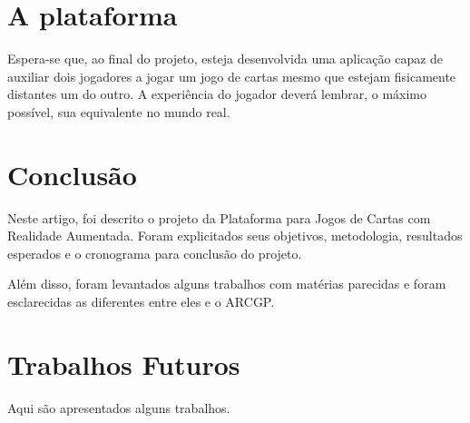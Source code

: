 \documentclass[conference]{IEEEtran}
\begin{document}
\section{A plataforma}
\label{plataforma}
Espera-se que, ao final do projeto, esteja desenvolvida uma aplicação capaz de 
auxiliar dois jogadores a jogar um jogo de cartas mesmo que estejam fisicamente 
distantes um do outro. A experiência do jogador deverá lembrar, o máximo 
possível, sua equivalente no mundo real.

\section{Conclusão}
\label{conclusao}
Neste artigo, foi descrito o projeto da Plataforma para Jogos de Cartas com 
Realidade Aumentada. Foram explicitados seus objetivos, metodologia, resultados 
esperados e o cronograma para conclusão do projeto.

Além disso, foram levantados alguns trabalhos com matérias parecidas e foram 
esclarecidas as diferentes entre eles e o ARCGP.

\section{Trabalhos Futuros}
\label{trab_fut}
Aqui são apresentados alguns trabalhos.



\end{document}
